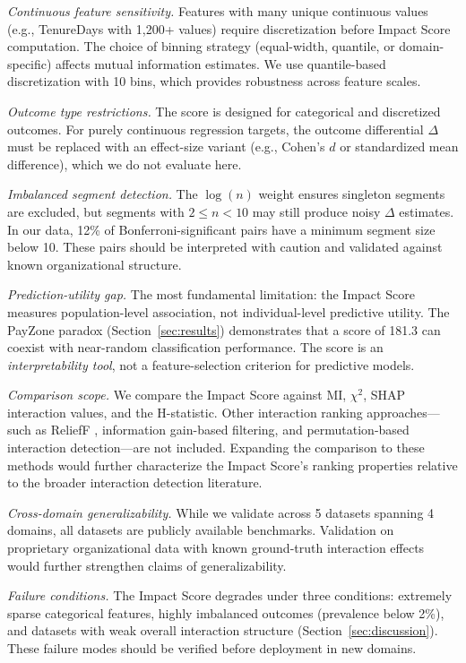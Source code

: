 \documentclass[conference]{IEEEtran}
\begin{document}
\textit{Continuous feature sensitivity.} Features with many unique continuous values (e.g., TenureDays with 1,200+ values) require discretization before Impact Score computation. The choice of binning strategy (equal-width, quantile, or domain-specific) affects mutual information estimates. We use quantile-based discretization with 10 bins, which provides robustness across feature scales.

\textit{Outcome type restrictions.} The score is designed for categorical and discretized outcomes. For purely continuous regression targets, the outcome differential $\Delta$ must be replaced with an effect-size variant (e.g., Cohen's $d$ or standardized mean difference), which we do not evaluate here.

\textit{Imbalanced segment detection.} The $\log(n)$ weight ensures singleton segments are excluded, but segments with $2 \leq n < 10$ may still produce noisy $\Delta$ estimates. In our data, 12\% of Bonferroni-significant pairs have a minimum segment size below 10. These pairs should be interpreted with caution and validated against known organizational structure.

\textit{Prediction-utility gap.} The most fundamental limitation: the Impact Score measures population-level association, not individual-level predictive utility. The PayZone paradox (Section~\ref{sec:results}) demonstrates that a score of 181.3 can coexist with near-random classification performance. The score is an \textit{interpretability tool}, not a feature-selection criterion for predictive models.

\textit{Comparison scope.} We compare the Impact Score against MI, $\chi^2$, SHAP interaction values, and the H-statistic. Other interaction ranking approaches---such as ReliefF \cite{urbanowicz2018relief}, information gain-based filtering, and permutation-based interaction detection---are not included. Expanding the comparison to these methods would further characterize the Impact Score's ranking properties relative to the broader interaction detection literature.

\textit{Cross-domain generalizability.} While we validate across 5 datasets spanning 4 domains, all datasets are publicly available benchmarks. Validation on proprietary organizational data with known ground-truth interaction effects would further strengthen claims of generalizability.

\textit{Failure conditions.} The Impact Score degrades under three conditions: extremely sparse categorical features, highly imbalanced outcomes (prevalence below 2\%), and datasets with weak overall interaction structure (Section~\ref{sec:discussion}). These failure modes should be verified before deployment in new domains.
\end{document}
